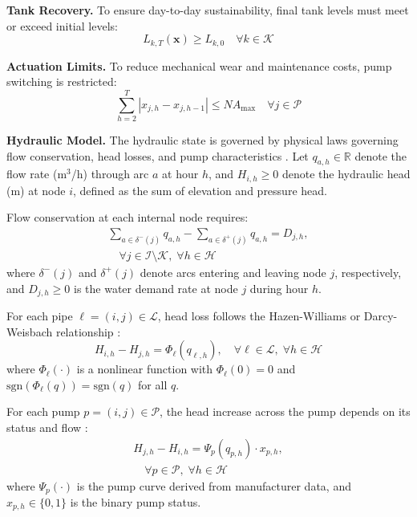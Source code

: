 \documentclass[final,3p,twocolumn]{elsarticle}
\begin{document}
\textbf{Tank Recovery.} To ensure day-to-day sustainability, final tank levels must meet or exceed initial levels:
\begin{equation}
	L_{k,T}(\mathbf{x}) \ge L_{k,0} \quad \forall k \in \mathcal{K}
	\label{eq:tank_recovery}
\end{equation}

\textbf{Actuation Limits.} To reduce mechanical wear and maintenance costs, pump switching is restricted:
\begin{equation}
	\sum_{h=2}^{T} |x_{j,h} - x_{j,h-1}| \le NA_{\max} \quad \forall j \in \mathcal{P}
	\label{eq:actuation_limits}
\end{equation}

\textbf{Hydraulic Model.} The hydraulic state is governed by physical laws governing flow conservation, head losses, and pump characteristics \cite{Bonvin2021}. Let $q_{a,h} \in \mathbb{R}$ denote the flow rate (m$^3$/h) through arc $a$ at hour $h$, and $H_{i,h} \geq 0$ denote the hydraulic head (m) at node $i$, defined as the sum of elevation and pressure head.

Flow conservation at each internal node requires:
\begin{multline}
	\sum_{a \in \delta^-(j)} q_{a,h} - \sum_{a \in \delta^+(j)} q_{a,h} = D_{j,h}, \\
	\quad \forall j \in \mathcal{I} \setminus \mathcal{K}, \; \forall h \in \mathcal{H}
	\label{eq:flow_conservation}
\end{multline}
where $\delta^-(j)$ and $\delta^+(j)$ denote arcs entering and leaving node $j$, respectively, and $D_{j,h} \geq 0$ is the water demand rate at node $j$ during hour $h$.

For each pipe $\ell = (i,j) \in \mathcal{L}$, head loss follows the Hazen-Williams or Darcy-Weisbach relationship \cite{Brown2002,Burgschweiger2009a}:
\begin{equation}
	H_{i,h} - H_{j,h} = \Phi_\ell(q_{\ell,h}), \quad \forall \ell \in \mathcal{L}, \; \forall h \in \mathcal{H}
	\label{eq:pipe_head_loss}
\end{equation}
where $\Phi_\ell(\cdot)$ is a nonlinear function with $\Phi_\ell(0) = 0$ and $\text{sgn}(\Phi_\ell(q)) = \text{sgn}(q)$ for all $q$.

For each pump $p = (i,j) \in \mathcal{P}$, the head increase across the pump depends on its status and flow \cite{Burgschweiger2009b,Morsi2012}:
\begin{multline}
	H_{j,h} - H_{i,h} = \Psi_p(q_{p,h}) \cdot x_{p,h}, \\
	\quad \forall p \in \mathcal{P}, \; \forall h \in \mathcal{H}
	\label{eq:pump_head}
\end{multline}
where $\Psi_p(\cdot)$ is the pump curve derived from manufacturer data, and $x_{p,h} \in \{0,1\}$ is the binary pump status.
\end{document}
